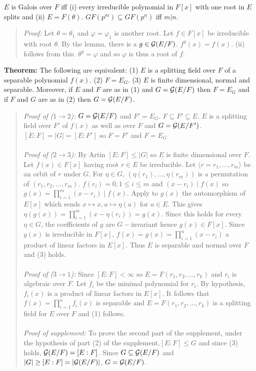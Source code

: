 $E$ is Galois over $F$ iff (i) every irreducible polynomial in $F[x]$ with one root in $E$
splits and (ii) $E=F(\theta)$.
$GF(p^m) \subseteq GF(p^n)$ iff $m|n$.
\begin{quote}
\emph{Proof:} 
Let $\theta= \theta_1$ and $\varphi= \varphi_1$ is another root.  Let $f \in F[x]$ 
be irreducible with root $\theta$.  By the lemma, 
there is a $g \in {\cal G}(E/F)$.  $f^g(x)=f(x)$. (ii) follows from this.
$\theta^g=\varphi$ and so $\varphi$ is thus a root of $f$.
\end{quote}
{\bf Theorem:}
The following are equivalent: (1) $E$ is a splitting field over $F$
of a separable polynomial $f(x)$.  (2) $F=E_G$. (3) $E$ is finite
dimensional, normal and separable.  Moreover, if $E$ and $F$ are as in (1) and
$G= {\cal G}(E/F)$ then $F=E_G$ and if $F$ and $G$ are as in (2) then $G={\cal G}(E/F)$.
\begin{quote}
\emph{Proof of
($1 \rightarrow 2$):}
$G={\cal G}(E/F)$ and $F'=E_G$. $F \subseteq F' \subseteq E$.  $E$ is a splitting field
over $F'$ of $f(x)$ as well as over $F$ and $G={\cal G}(E/F')$. $[E:F]= |G| = [E:F']$ so
$F=F'$ and $F=E_G$
\\
\\
\emph{Proof of
($2 \rightarrow 3$):}
By Artin $[E:F] \le |G|$ so $E$ is finite dimensional over $F$.  Let $f(x) \in F[x]$
having root $r \in E$ be irreducible.  Let $\langle r=r_1, \ldots, r_m \rangle$
be an orbit of $r$ under $G$.  For $\eta \in G$, $(\eta(r_1) , \ldots , \eta(r_m))$ is
a permutation of $(r_1 , r_2, \ldots , r_m)$.  $f(r_i)=0, 1 \leq i \leq m$ and
$(x-r_i) \mid f(x)$ so $g(x)= \prod_{i=1}^m (x-r_i) \mid f(x)$.  Apply to $g(x)$
the automorphism of $E[x]$ which sends $x \mapsto x, a \mapsto \eta(a)$ for $a \in E$.
This gives $\eta(g(x))= \prod_{i=1}^m (x-\eta(r_i))= g(x)$.  Since this holds for every
$\eta \in G$, the coefficients of $g$ are $G-$invariant hence $g(x) \in F[x]$.  Since
$g(x)$ is irreducible in $F[x]$, $f(x)=g(x)= \prod_{i=1}^n (x-r_i)$ a product of linear
factors in $E[x]$.  Thus $E$ is separable and normal over $F$ and (3) holds.
\\
\\
\emph{Proof of
($3 \rightarrow 1$):}
Since $[E:F] < \infty$ so $E= F(r_1, r_2, \ldots, r_k)$ and $r_i$ is algebraic over $F$.
Let $f_i$ be the minimal polynomial for $r_i$.  By hypothesis, $f_i(x)$ is a product of
linear factors in $E[x]$.   It follows that $f(x)= \prod_{i=1}^n f_i(x)$ is separable
and $E= F(r_1, r_2, \ldots, r_k)$ is a splitting field for $E$ over $F$ and (1)
follows.
\\
\\
\emph{Proof of supplement:}
To prove the second part of the supplement, under the hypothesis of part (2) of the supplement,$[E:F] \leq G$
and since (3) holds, ${\cal G}(E/F)=[E:F]$.  Since
$G \subseteq {\cal G}(E/F)$ and 
$|G| \geq [E:F]= |{\cal G}(E/F)|$, $G= {\cal G}(E/F)$.
\end{quote}
